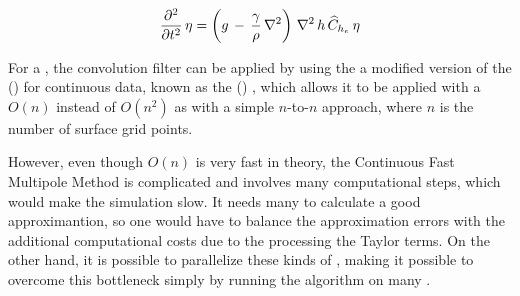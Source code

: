 \begin{equation} \label{eq:diffeqnouserdefinedoperators}
\frac{\partial^2}{\partial t^2}\,\eta = \left(g\,-\,\frac{\gamma}{\rho}\,\nabla^2\right)\,\nabla^2\,h\,\widehat{C}_{h_e}\,\eta
\end{equation}

For a , the convolution filter can be applied by using the a modified version of the  () \citep{Greengard1985,Greengard1987} for continuous data, known as the  () \citep{White1994}, which allows it to be applied with a $O(n)$   instead of $O(n^2)$ as with a simple $n$-to-$n$ approach, where $n$ is the number of surface grid points.

However, even though $O(n)$ is very fast in theory, the Continuous Fast Multipole Method is complicated and involves many computational steps, which would make the simulation slow. It needs many  to calculate a good approximantion, so one would have to balance the approximation errors with the additional computational costs due to the processing the Taylor terms. On the other hand, it is possible to parallelize these kinds of  \citep[see e.g.][]{Board1994}, making it possible to overcome this bottleneck simply by running the algorithm on many .
